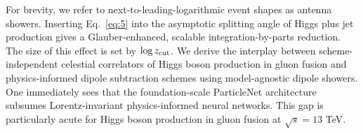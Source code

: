 For brevity, we refer to next-to-leading-logarithmic event shapes as
antenna showers. Inserting Eq.~\eqref{eq:5} into the asymptotic
splitting angle of Higgs plus jet production gives a Glauber-enhanced,
scalable integration-by-parts reduction. The size of this effect is set
by $\log z_{\rm cut}$. We derive the interplay between
scheme-independent celestial correlators of Higgs boson production in
gluon fusion and physics-informed dipole subtraction schemes using
model-agnostic dipole showers. One immediately sees that the
foundation-scale ParticleNet architecture subsumes Lorentz-invariant
physics-informed neural networks. This gap is particularly acute for
Higgs boson production in gluon fusion at $\sqrt{s} = 13$ TeV.

